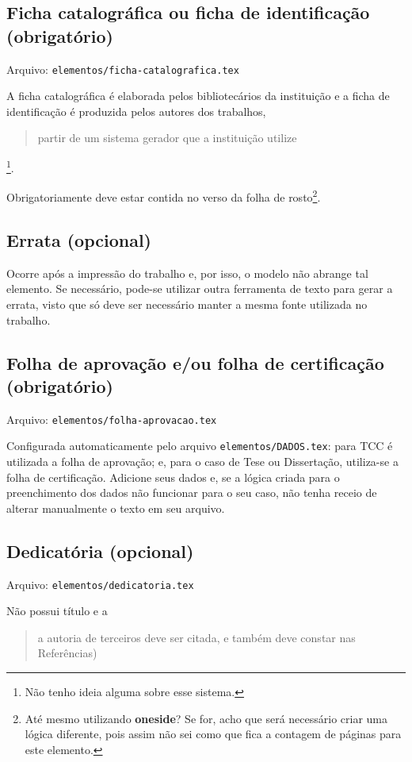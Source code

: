 \subsection{Ficha catalográfica ou ficha de identificação (obrigatório)}
    Arquivo: \texttt{elementos/ficha-catalografica.tex}

    A ficha catalográfica é elaborada pelos bibliotecários da instituição e a ficha de identificação é produzida pelos autores dos trabalhos, \blockcquote[p. 15]{livro:iffar-guia-normalizacao-2022}{partir de um sistema gerador que a instituição utilize}\footnote{Não tenho ideia alguma sobre esse sistema.}.

    Obrigatoriamente deve estar contida no verso da folha de rosto\footnote{Até mesmo utilizando \textbf{oneside}? Se for, acho que será necessário criar uma lógica diferente, pois assim não sei como que fica a contagem de páginas para este elemento.}.
    
\subsection{Errata (opcional)}
    Ocorre após a impressão do trabalho e, por isso, o modelo não abrange tal elemento. Se necessário, pode-se utilizar outra ferramenta de texto para gerar a errata, visto que só deve ser necessário manter a mesma fonte utilizada no trabalho.
    
\subsection{Folha de aprovação e/ou folha de certificação (obrigatório)}
    Arquivo: \texttt{elementos/folha-aprovacao.tex}

    Configurada automaticamente pelo arquivo \texttt{elementos/DADOS.tex}: para TCC é utilizada a folha de aprovação; e, para o caso de Tese ou Dissertação, utiliza-se a folha de certificação. Adicione seus dados e, se a lógica criada para o preenchimento dos dados não funcionar para o seu caso, não tenha receio de alterar manualmente o texto em seu arquivo.
    
\subsection{Dedicatória (opcional)}
    Arquivo: \texttt{elementos/dedicatoria.tex}

    Não possui título e a \blockcquote[p. 32]{livro:iffar-guia-normalizacao-2022}{a autoria de terceiros deve ser citada, e também deve constar nas Referências)}.

